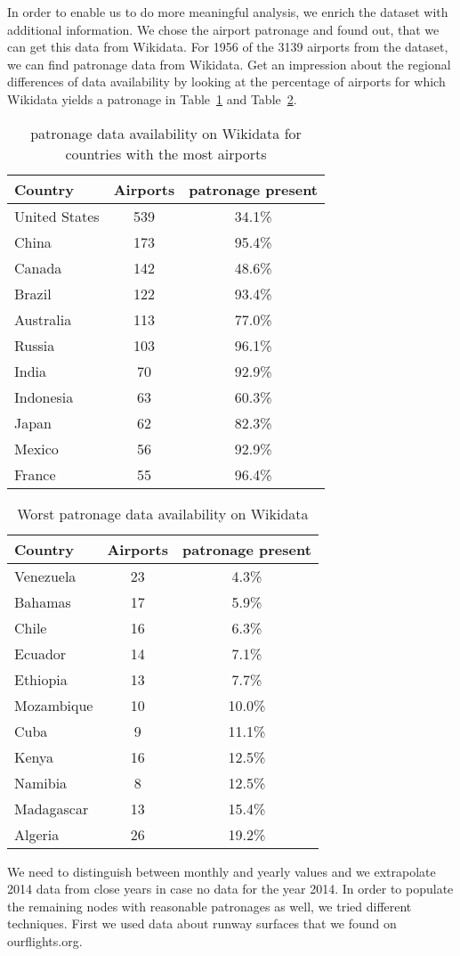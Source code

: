 \documentclass[twocolumn]{tum-article}
\begin{document}
In order to enable us to do more meaningful analysis, we enrich the dataset with additional information. We chose the airport patronage and found out, that we can get this data from Wikidata. 
For 1956 of the 3139 airports from the dataset, we can find patronage data from Wikidata. Get an impression about the regional differences of data availability by looking at the percentage of airports for which Wikidata yields a patronage in Table~\ref{tab:patr_av_most_airports} and Table~\ref{tab:patr_av_worst}.
\begin{table}[h]
	\centering
	\caption{patronage data availability on Wikidata for countries with the most airports}
	\label{tab:patr_av_most_airports}
	\begin{tabular}{|l|c|c|}
		\hline
		Country & Airports & patronage present \\ \hline
		United States & 539 & 34.1\%\\
		China & 173 & 95.4\%\\
		Canada & 142 & 48.6\%\\
		Brazil & 122 & 93.4\%\\
		Australia & 113 & 77.0\%\\
		Russia & 103 & 96.1\%\\
		India & 70 & 92.9\%\\
		Indonesia & 63 & 60.3\%\\
		Japan & 62 & 82.3\%\\
		Mexico & 56 & 92.9\%\\
		France & 55 & 96.4\%\\ \hline
	\end{tabular}
\end{table}
\begin{table}[h]
	\centering
	\caption{Worst patronage data availability on Wikidata}
	\label{tab:patr_av_worst}
	\begin{tabular}{|l|c|c|}
		\hline
		Country & Airports & patronage present \\ \hline
		Venezuela & 23 & 4.3\%\\
		Bahamas & 17 & 5.9\%\\
		Chile & 16 & 6.3\%\\
		Ecuador & 14 & 7.1\%\\
		Ethiopia & 13 & 7.7\%\\ 
		Mozambique & 10 & 10.0\%\\
		Cuba & 9 & 11.1\%\\
		Kenya & 16 & 12.5\%\\
		Namibia & 8 & 12.5\%\\
		Madagascar & 13 & 15.4\%\\
		Algeria & 26 & 19.2\%\\ \hline
	\end{tabular}
\end{table}
We need to distinguish between monthly and yearly values and we extrapolate 2014 data from close years in case no data for the year 2014. 
In order to populate the remaining nodes with reasonable patronages as well, we tried different techniques. 
First we used data about runway surfaces that we found on ourflights.org. 
\end{document}
